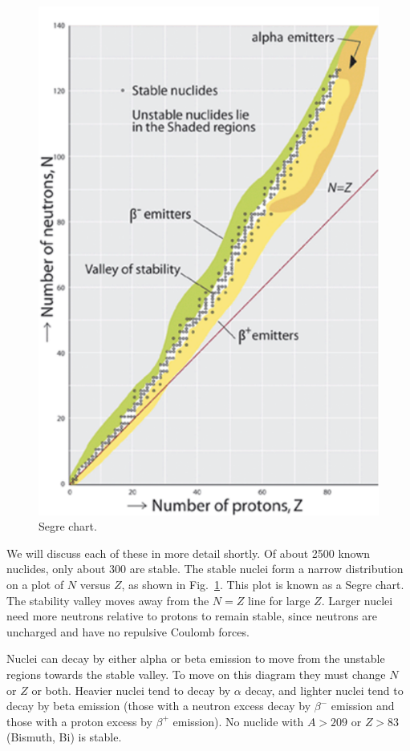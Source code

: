 \begin{figure}[h!]
\centering
\includegraphics[width=0.6\columnwidth]{plots/stability.pdf}
\caption{\label{fig:stability} Segre chart.}  
\end{figure}

We will discuss each of these in more detail shortly. Of about 2500 known nuclides, only about 300 are stable.  The stable nuclei form a narrow distribution on a plot of $N$ versus $Z$, as shown in Fig.~\ref{fig:stability}.  This plot is known as a Segre chart. The stability valley moves away from the $N=Z$ line for large $Z$. Larger nuclei need more neutrons relative to protons to remain stable, since neutrons are uncharged and have no repulsive Coulomb forces.  

 Nuclei can decay by either alpha or beta emission to move from the unstable regions towards the stable valley. To move on this diagram they must change $N$ or $Z$ or both.  Heavier nuclei tend to decay by $\alpha$ decay, and lighter nuclei tend to decay by beta emission (those with a neutron excess decay by $\beta^{-}$ emission and those with a proton excess by $\beta^{+}$ emission). No nuclide with $A>209$ or $Z>83$ (Bismuth, Bi) is stable.
